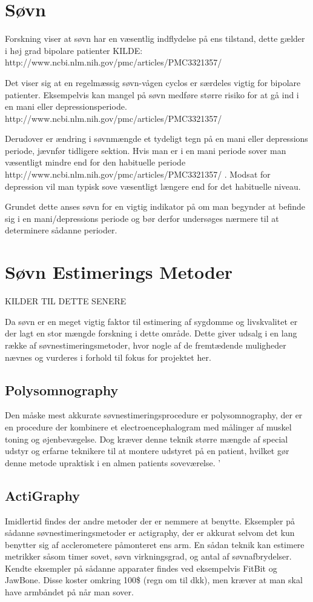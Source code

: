 \section{Søvn}
Forskning viser at søvn har en væsentlig indflydelse på ens tilstand, dette gælder i høj grad bipolare patienter KILDE: http://www.ncbi.nlm.nih.gov/pmc/articles/PMC3321357/

Det viser sig at en regelmæssig søvn-vågen cyclos er særdeles vigtig for bipolare patienter.
Eksempelvis kan mangel på søvn medføre større risiko for at gå ind i en mani eller depressionsperiode. http://www.ncbi.nlm.nih.gov/pmc/articles/PMC3321357/

Derudover er ændring i søvnmængde et tydeligt tegn på en mani eller depressions periode, jævnfør tidligere sektion.
Hvis man er i en mani periode sover man væsentligt mindre end for den habituelle periode http://www.ncbi.nlm.nih.gov/pmc/articles/PMC3321357/ .
Modsat for depression vil man typisk sove væsentligt længere end for det habituelle niveau.

Grundet dette anses søvn for en vigtig indikator på om man begynder at befinde sig i en mani/depressions periode og bør derfor undersøges nærmere til at determinere sådanne perioder.

\section{Søvn Estimerings Metoder}
KILDER TIL DETTE SENERE

Da søvn er en meget vigtig faktor til estimering af sygdomme og livskvalitet er der lagt en stor mængde forskning i dette område.
Dette giver udsalg i en lang række af søvnestimeringsmetoder, hvor nogle af de fremtædende muligheder nævnes og vurderes i forhold til fokus for projektet her.

\subsection{Polysomnography}
Den måske mest akkurate søvnestimeringsprocedure er polysomnography, der er en procedure der kombinere et electroencephalogram med målinger af muskel toning og øjenbevægelse.
Dog kræver denne teknik større mængde af special udstyr og erfarne teknikere til at montere udstyret på en patient, hvilket gør denne metode upraktisk i en almen patients soveværelse.
'
\subsection{ActiGraphy}
Imidlertid findes der andre metoder der er nemmere at benytte.
Eksempler på sådanne søvnestimeringsmetoder er actigraphy, der er akkurat selvom det kun benytter sig af acclerometere påmonteret ens arm.
En sådan teknik kan estimere metrikker såsom timer sovet, søvn virkningsgrad, og antal af søvnafbrydelser.
Kendte eksempler på sådanne apparater findes ved eksempelvis FitBit og JawBone.
Disse koster omkring 100\$ (regn om til dkk), men kræver at man skal have armbåndet på når man sover.

